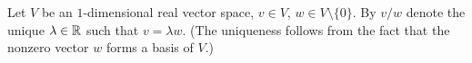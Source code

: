 \begin{notation}
  Let
    $V$ be an $1$-dimensional real vector space,
    $v \in V$,
    $w \in V \setminus \{0\}$.
  By $v / w$ denote the unique $\lambda \in \mathbb{R}$ such that $v = \lambda w$.
  (The uniqueness follows from the fact that the nonzero vector $w$ forms a
  basis of $V$.)
\end{notation}
